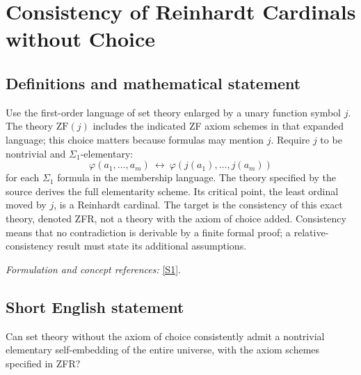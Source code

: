 \documentclass[11pt]{article}
\newcommand{\sref}[2]{\hyperlink{source:#1:#2}{[S#2]}}
\newif\ifshowcatalogue
\newcommand{\cataloguescope}[1]{\ifshowcatalogue
 \paragraph{Exact scope in the supplied catalogue.}
 \begin{quote}\small #1\end{quote}\fi}
\begin{document}
\setcounter{section}{151}
\clearpage
\section{\texorpdfstring{Consistency of Reinhardt Cardinals without Choice}{Consistency of Reinhardt Cardinals without Choice}}\label{152}
\subsection{Definitions and mathematical statement}
Use the first-order language of set theory enlarged by a unary function symbol $j$. The theory $\mathrm{ZF}(j)$ includes the indicated ZF axiom schemes in that expanded language; this choice matters because formulas may mention $j$. Require $j$ to be nontrivial and $\Sigma_1$-elementary:
\[
 \varphi(a_1,\ldots,a_m)\ \longleftrightarrow\
 \varphi(j(a_1),\ldots,j(a_m))
\]
for each $\Sigma_1$ formula in the membership language. The theory specified by the source derives the full elementarity scheme. Its critical point, the least ordinal moved by $j$, is a Reinhardt cardinal. The target is the consistency of this exact theory, denoted ZFR, not a theory with the axiom of choice added. Consistency means that no contradiction is derivable by a finite formal proof; a relative-consistency result must state its additional assumptions.
\par\smallskip\textit{Formulation and concept references:} \sref{152}{1}.
\cataloguescope{Determine whether ZFR is consistent, where ZFR is the first-order theory ZF(j) plus the assertion that a nontrivial function symbol j:V->V is Sigma\_1-elementary and hence fully elementary as a theorem scheme.}
\subsection{Short English statement}
Can set theory without the axiom of choice consistently admit a nontrivial elementary self-embedding of the entire universe, with the axiom schemes specified in ZFR?
\end{document}
